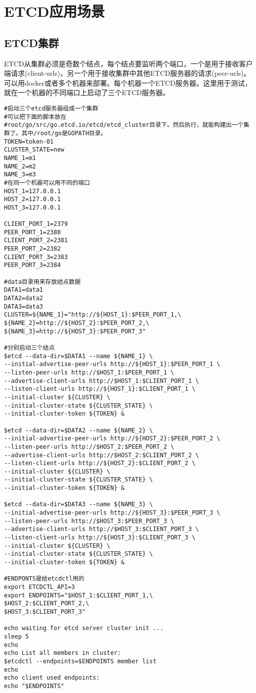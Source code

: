 \mylineskip
\chapter{ETCD应用场景}\label{chaper:ch1}
\section{ETCD集群}
ETCD从集群必须是奇数个结点，每个结点要监听两个端口，一个是用于接收客户端请求(client-urls)，另一个用于接收集群中其他ETCD服务器的请求(peer-urls)。
可以用docker或者多个机器来部署。每个机器一个ETCD服务器。这里用于测试，就在一个机器的不同端口上启动了三个ETCD服务器。
\begin{verbatim}
#启动三个etcd服务器组成一个集群
#可以把下面的脚本放在
#root/go/src/go.etcd.io/etcd/etcd_cluster目录下。然后执行，就能构建出一个集群了。其中/root/go是GOPATH目录。
TOKEN=token-01
CLUSTER_STATE=new
NAME_1=m1
NAME_2=m2
NAME_3=m3
#在同一个机器可以用不同的端口
HOST_1=127.0.0.1
HOST_2=127.0.0.1
HOST_3=127.0.0.1

CLIENT_PORT_1=2379
PEER_PORT_1=2380
CLIENT_PORT_2=2381
PEER_PORT_2=2382
CLIENT_PORT_3=2383
PEER_PORT_3=2384

#data目录用来存放结点数据
DATA1=data1
DATA2=data2
DATA3=data3
CLUSTER=${NAME_1}="http://${HOST_1}:$PEER_PORT_1,\
${NAME_2}=http://${HOST_2}:$PEER_PORT_2,\
${NAME_3}=http://${HOST_3}:$PEER_PORT_3"

#分别启动三个结点
$etcd --data-dir=$DATA1 --name ${NAME_1} \
--initial-advertise-peer-urls http://${HOST_1}:$PEER_PORT_1 \
--listen-peer-urls http://$HOST_1:$PEER_PORT_1 \
--advertise-client-urls http://$HOST_1:$CLIENT_PORT_1 \
--listen-client-urls http://${HOST_1}:$CLIENT_PORT_1 \
--initial-cluster ${CLUSTER} \
--initial-cluster-state ${CLUSTER_STATE} \
--initial-cluster-token ${TOKEN} &

$etcd --data-dir=$DATA2 --name ${NAME_2} \
--initial-advertise-peer-urls http://${HOST_2}:$PEER_PORT_2 \
--listen-peer-urls http://$HOST_2:$PEER_PORT_2 \
--advertise-client-urls http://$HOST_2:$CLIENT_PORT_2 \
--listen-client-urls http://${HOST_2}:$CLIENT_PORT_2 \
--initial-cluster ${CLUSTER} \
--initial-cluster-state ${CLUSTER_STATE} \
--initial-cluster-token ${TOKEN} &

$etcd --data-dir=$DATA3 --name ${NAME_3} \
--initial-advertise-peer-urls http://${HOST_3}:$PEER_PORT_3 \
--listen-peer-urls http://$HOST_3:$PEER_PORT_3 \
--advertise-client-urls http://$HOST_3:$CLIENT_PORT_3 \
--listen-client-urls http://${HOST_3}:$CLIENT_PORT_3 \
--initial-cluster ${CLUSTER} \
--initial-cluster-state ${CLUSTER_STATE} \
--initial-cluster-token ${TOKEN} &

#ENDPONTS是给etcdctl用的
export ETCDCTL_API=3
export ENDPOINTS="$HOST_1:$CLIENT_PORT_1,\
$HOST_2:$CLIENT_PORT_2,\
$HOST_3:$CLIENT_PORT_3"

echo waiting for etcd server cluster init ...
sleep 5
echo
echo List all members in cluster:
$etcdctl --endpoints=$ENDPOINTS member list
echo
echo client used endpoints:
echo "$ENDPOINTS"

\end{verbatim}

